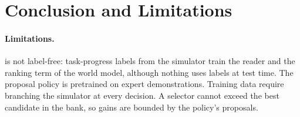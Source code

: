 \section{Conclusion and Limitations}
\label{sec:conclusion}


\paragraph{Limitations.}
\method is not label-free: task-progress labels from the simulator train the reader and the ranking term of the world model, although nothing uses labels at test time.
The proposal policy is pretrained on expert demonstrations.
Training data require branching the simulator at every decision.
A selector cannot exceed the best candidate in the bank, so gains are bounded by the policy's proposals.

